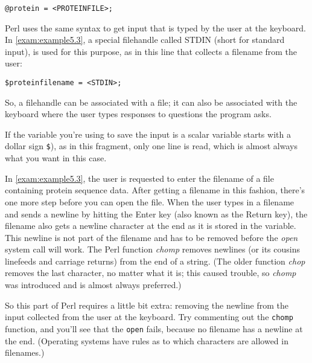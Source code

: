 \begin{lstlisting}
@protein = <PROTEINFILE>;
\end{lstlisting}

Perl uses the same syntax to get input that is typed by the user at the keyboard. In \autoref{exam:example5.3}, a special filehandle called STDIN (short for standard input), is used for this purpose, as in this line that collects a filename from the user:

\begin{lstlisting}
$proteinfilename = <STDIN>;
\end{lstlisting}

So, a filehandle can be associated with a file; it can also be associated with the keyboard where the user types responses to questions the program asks.

If the variable you're using to save the input is a scalar variable starts with a dollar sign \verb|$|), as in this fragment, only one line is read, which is almost always what you want in this case.

In \autoref{exam:example5.3}, the user is requested to enter the filename of a file containing protein sequence data. After getting a filename in this fashion, there's one more step before you can open the file. When the user types in a filename and sends a newline by hitting the Enter key (also known as the Return key), the filename also gets a newline character at the end as it is stored in the variable. This newline is not part of the filename and has to be removed before the \textit{open} system call will work. The Perl function \textit{chomp} removes newlines (or its cousins linefeeds and carriage returns) from the end of a string. (The older function \textit{chop} removes the last character, no matter what it is; this caused trouble, so \textit{chomp} was introduced and is almost always preferred.)

So this part of Perl requires a little bit extra: removing the newline from the input collected from the user at the keyboard. Try commenting out the \verb|chomp| function, and you'll see that the \verb|open| fails, because no filename has a newline at the end. (Operating systems have rules as to which characters are allowed in filenames.) 

